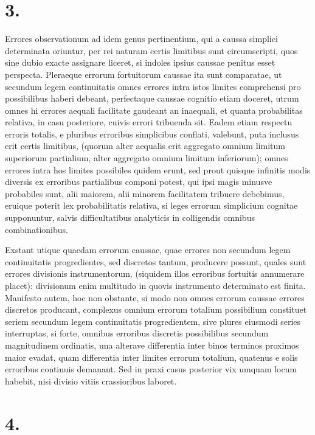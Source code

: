 \documentclass[12pt,a4paper]{book}
\begin{document}
\section*{3.}
\label{sec:art3}

Errores observationum ad idem genus pertinentium, qui a caussa simplici determinata oriuntur, per rei naturam certis limitibus sunt circumscripti, quos sine dubio exacte assignare liceret, si indoles ipsius caussae penitus esset perspecta. Pleraeque errorum fortuitorum caussae ita sunt comparatae, ut secundum legem continuitatis omnes errores intra istos limites comprehensi pro possibilibus haberi debeant, perfectaque caussae cognitio etiam doceret, utrum omnes hi errores aequali facilitate gaudeant an inaequali, et quanta probabilitas relativa, in casu posteriore, cuivis errori tribuenda sit. Eadem etiam respectu erroris totalis, e pluribus erroribus simplicibus conflati, valebunt, puta inclusus erit certis limitibus, (quorum alter aequalis erit aggregato omnium limitum superiorum partialium, alter aggregato omnium limitum inferiorum); omnes errores intra hos limites possibiles quidem erunt, sed prout quisque infinitis modis diversis ex erroribus partialibus componi potest, qui ipsi magis minusve probabiles sunt, alii maiorem, alii minorem facilitatem tribuere debebimus, eruique poterit lex probabilitatis relativa, si leges errorum simplicium cognitae supponuntur, salvis difficultatibus analyticis in colligendis omnibus combinationibus.

Exstant utique quaedam errorum caussae, quae errores non secundum legem continuitatis progredientes, sed discretos tantum, producere possunt, quales sunt errores divisionis instrumentorum, (siquidem illos erroribus fortuitis annumerare placet): divisionum enim multitudo in quovis instrumento determinato est finita. Manifesto autem, hoc non obstante, si modo non omnes errorum caussae errores discretos producant, complexus omnium errorum totalium possibilium constituet seriem secundum legem continuitatis progredientem, sive plures eiusmodi series interruptas, si forte, omnibus erroribus discretis possibilibus secundum magnitudinem ordinatis, una alterave differentia inter binos terminos proximos maior evadat, quam differentia inter limites errorum totalium, quatenus e solis erroribus continuis demanant. Sed in praxi casus posterior vix umquam locum habebit, nisi divisio vitiis crassioribus laboret.

\section*{4.}
\label{sec:art4}
\end{document}
